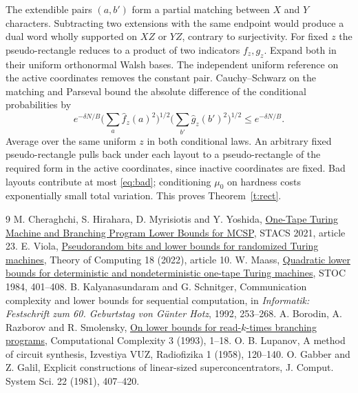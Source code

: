 \documentclass[11pt]{article}
\begin{document}
The extendible pairs $(a,b')$ form a partial matching between $X$ and $Y$ characters. Subtracting two extensions with the same endpoint would produce a dual word wholly supported on $XZ$ or $YZ$, contrary to surjectivity. For fixed $z$ the pseudo-rectangle reduces to a product of two indicators $f_z,g_z$. Expand both in their uniform orthonormal Walsh bases. The independent uniform reference on the active coordinates removes the constant pair. Cauchy--Schwarz on the matching and Parseval bound the absolute difference of the conditional probabilities by
\[
 e^{-\delta N/B}\Big(\sum_a\widehat f_z(a)^2\Big)^{1/2}
                    \Big(\sum_{b'}\widehat g_z(b')^2\Big)^{1/2}
 \le e^{-\delta N/B}.
\]
Average over the same uniform $z$ in both conditional laws. An arbitrary fixed pseudo-rectangle pulls back under each layout to a pseudo-rectangle of the required form in the active coordinates, since inactive coordinates are fixed. Bad layouts contribute at most \eqref{eq:bad}; conditioning $\mu_0$ on hardness costs exponentially small total variation. This proves Theorem~\ref{t:rect}.


\begin{thebibliography}{9}
 M. Cheraghchi, S. Hirahara, D. Myrisiotis and Y. Yoshida, \href{https://doi.org/10.4230/LIPIcs.STACS.2021.23}{One-Tape Turing Machine and Branching Program Lower Bounds for MCSP}, STACS 2021, article 23.
 E. Viola, \href{https://theoryofcomputing.org/articles/v018a010/}{Pseudorandom bits and lower bounds for randomized Turing machines}, Theory of Computing 18 (2022), article 10.
 W. Maass, \href{https://doi.org/10.1145/800057.808706}{Quadratic lower bounds for deterministic and nondeterministic one-tape Turing machines}, STOC 1984, 401--408.
 B. Kalyanasundaram and G. Schnitger, Communication complexity and lower bounds for sequential computation, in \emph{Informatik: Festschrift zum 60. Geburtstag von G\"unter Hotz}, 1992, 253--268.
 A. Borodin, A. Razborov and R. Smolensky, \href{https://www.cs.toronto.edu/~bor/Papers/lower-bounds-read-k-times-branching.pdf}{On lower bounds for read-$k$-times branching programs}, Computational Complexity 3 (1993), 1--18.
 O. B. Lupanov, A method of circuit synthesis, Izvestiya VUZ, Radiofizika 1 (1958), 120--140.
 O. Gabber and Z. Galil, Explicit constructions of linear-sized superconcentrators, J. Comput. System Sci. 22 (1981), 407--420.
\end{thebibliography}
\end{document}
